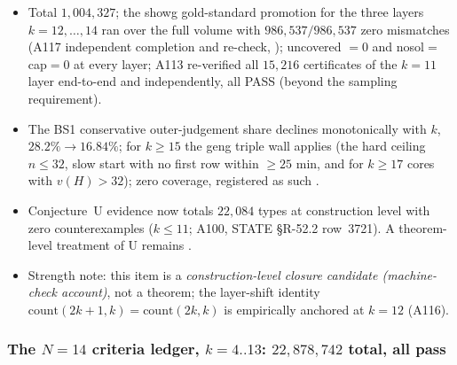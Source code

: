 \begin{itemize}
\item Total $1{,}004{,}327$; the showg gold-standard promotion for the three
layers $k=12,\dots,14$ ran over the full volume with
$986{,}537/986{,}537$ zero mismatches (A117 independent completion and
re-check, ); uncovered $=0$ and
nosol$=$cap$=0$ at every layer; A113 re-verified all $15{,}216$ certificates
of the $k=11$ layer end-to-end and independently, all PASS (beyond the
sampling requirement).
\item The BS1 conservative outer-judgement share declines monotonically with
$k$, $28.2\%\to16.84\%$; for $k\ge15$ the geng triple wall applies (the hard
ceiling $n\le32$, slow start with no first row within $\ge25$ min, and for
$k\ge17$ cores with $v(H)>32$); zero coverage, registered as such
\openlab.
\item Conjecture~U evidence now totals $22{,}084$ types at construction level
with zero counterexamples ($k\le11$; A100, STATE \S R-52.2 row~3721). A
theorem-level treatment of U remains \openlab.
\item Strength note: this item is a \emph{construction-level closure candidate
(machine-check account)}, not a theorem; the layer-shift identity
$\mathrm{count}(2k+1,k)=\mathrm{count}(2k,k)$ is empirically anchored at
$k=12$ (A116).
\end{itemize}

\subsubsection{The $N=14$ criteria ledger, $k=4..13$: $22{,}878{,}742$ total,
all pass \tierMCA}\label{subsubsec:add-critledger}

